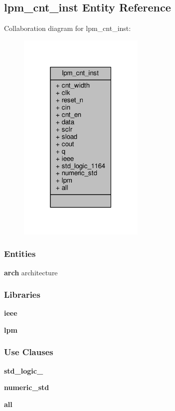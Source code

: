 \subsection{lpm\+\_\+cnt\+\_\+inst Entity Reference}
\label{classlpm__cnt__inst}


Collaboration diagram for lpm\+\_\+cnt\+\_\+inst\+:\nopagebreak
\begin{figure}[H]
\begin{center}
\leavevmode
\includegraphics[width=171pt]{d5/dc9/classlpm__cnt__inst__coll__graph}
\end{center}
\end{figure}
\subsubsection*{Entities}
\begin{DoxyCompactItemize}
\item 
{\bf arch} architecture
\end{DoxyCompactItemize}
\subsubsection*{Libraries}
 \begin{DoxyCompactItemize}
\item 
{\bf ieee} 
\item 
{\bf lpm} 
\end{DoxyCompactItemize}
\subsubsection*{Use Clauses}
 \begin{DoxyCompactItemize}
\item 
{\bf std\+\_\+logic\+\_}   
\item 
{\bf numeric\+\_\+std}   
\item 
{\bf  all }   
\end{DoxyCompactItemize}
